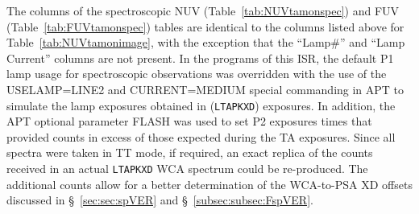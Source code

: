 The columns of the spectroscopic NUV (Table~\ref{tab:NUVtamonspec}) and FUV (Table~\ref{tab:FUVtamonspec})
tables are identical to the columns listed above for Table~\ref{tab:NUVtamonimage}, with the exception that
the ``Lamp\#''  and ``Lamp Current'' columns are not present. In the programs of this ISR,
the default P1 lamp usage for spectroscopic observations was overridden with the use of the \textsc{USELAMP=LINE2} and \textsc{CURRENT=MEDIUM} special commanding
in APT to simulate the lamp exposures obtained in   (\texttt{LTAPKXD}) exposures.
In addition, the APT optional parameter \textsc{FLASH} was used to set P2 exposures times that
provided counts in excess of those expected during the TA exposures.  Since all spectra were taken in TT mode,
if required, an exact replica of the counts received in an actual \texttt{LTAPKXD} WCA spectrum could be re-produced.
The additional counts allow for a better determination of the WCA-to-PSA XD offsets discussed in \S~\ref{sec:sec:spVER} and \S~\ref{subsec:subsec:FspVER}.
\normalsize



